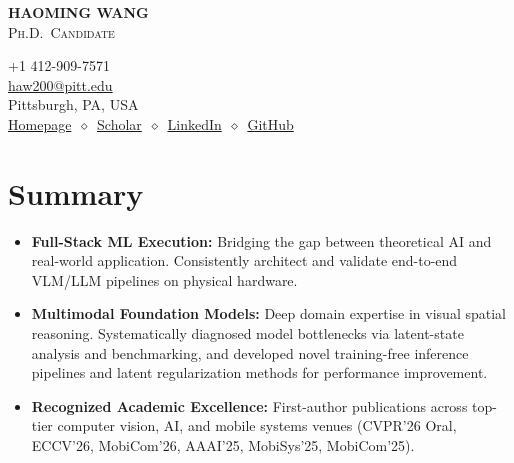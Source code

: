 \documentclass[11pt, letterpaper]{article}
\begin{document}
\noindent
\begin{minipage}[t]{0.58\linewidth}
  \vspace{0pt}
  {\fontsize{24pt}{26pt}\selectfont \textbf{HAOMING WANG}}\\[2pt]
  {\scshape\normalsize Ph.D.\ Candidate}
\end{minipage}%
\begin{minipage}[t]{0.42\linewidth}
  \vspace{0pt}
  \raggedleft\small
  +1 412-909-7571 \\
  \href{mailto:haw200@pitt.edu}{haw200@pitt.edu} \\
  Pittsburgh, PA, USA \\[2pt]
  \href{https://haomingwang645.github.io/}{Homepage}\ $\diamond$\ \href{https://scholar.google.com.hk/citations?user=bf6LCjUAAAAJ}{Scholar}\ $\diamond$\ \href{https://www.linkedin.com/in/haoming-wang-40a6a7239/}{LinkedIn}\ $\diamond$\ \href{https://github.com/HaomingWang645}{GitHub}
\end{minipage}

\section{Summary}
\begin{itemize}[leftmargin=1.1em, itemsep=2pt, topsep=2pt]
  \item \textbf{Full-Stack ML Execution:} Bridging the gap between theoretical AI and real-world application. Consistently architect and validate end-to-end VLM/LLM pipelines on physical hardware.
  \item \textbf{Multimodal Foundation Models:} Deep domain expertise in visual spatial reasoning. Systematically diagnosed model bottlenecks via latent-state analysis and benchmarking, and developed novel training-free inference pipelines and latent regularization methods for performance improvement.
  \item \textbf{Recognized Academic Excellence:} First-author publications across top-tier computer vision, AI, and mobile systems venues (CVPR'26 Oral, ECCV'26, MobiCom'26, AAAI'25, MobiSys'25, MobiCom'25).
\end{itemize}

\end{document}
